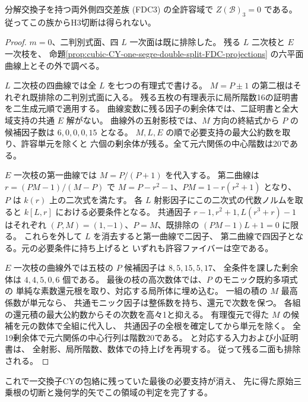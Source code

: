 \begin{theorem}\label{thm:cubic-CY-one-segre-double-split-FDC-empty}
分解交換子を持つ両外側四交差族 (FDC3) の全許容域で
$Z(\mathcal B)_3=0$ である。従ってこの族からH3切断は得られない。
\end{theorem}
\begin{proof}
$m=0$、二判別式面、四 $L$ 一次面は既に排除した。
残る $L$ 二次枝と $E$ 一次枝を、
命題\ref{prop:cubic-CY-one-segre-double-split-FDC-projections}
の六平面曲線上とその外で調べる。

$L$ 二次枝の四曲線では全 $L$ を七つの有理式で書ける。
$M=P\pm1$ の第二根はそれぞれ既排除の二判別式面に入る。
残る五枚の有理表示に局所階数16の証明書を二生成元順で適用する。
曲線変数に残る因子の剰余体では、二証明書と全大域支持の共通 $E$ 解がない。
曲線外の五射影枝では、$M$ 方向の終結式から
$P$ の候補因子数は $6,0,0,0,15$ となる。
$M,L,E$ の順で必要支持の最大公約数を取り、許容単元を除くと
六個の剰余体が残る。全て元六関係の中心階数は20である。

$E$ 一次枝の第一曲線では $M=P/(P+1)$ を代入する。
第二曲線は $r=(PM-1)/(M-P)$ で
$M=P-r^2-1$、$PM=1-r(r^2+1)$ となり、
$P$ は $k(r)$ 上の二次式を満たす。
各 $L$ 射影因子にこの二次式の代数ノルムを取ると
$k[L,r]$ における必要条件となる。
共通因子 $r-1,r^2+1,L(r^3+r)-1$ はそれぞれ
$(P,M)=(1,-1)$、$P=M$、既排除の $(PM-1)L+1=0$ に限る。
これらを外して $L$ を消去すると第一曲線で二因子、
第二曲線で四因子となる。元の必要条件に持ち上げると
いずれも許容ファイバーは空である。

$E$ 一次枝の曲線外では五枝の $P$ 候補因子は $8,5,15,5,17$、
全条件を課した剰余体は $4,4,5,0,6$ 個である。
最後の枝の高次数体では、$P$ のモニック既約多項式の
単純な素数還元根を取り、対応する局所体に埋め込む。
一組の積の $M$ 最高係数が単元なら、
共通モニック因子は整係数を持ち、還元で次数を保つ。
各組の還元積の最大公約数からその次数を高々1と抑える。
有理復元で得た $M$ の候補を元の数体で全組に代入し、
共通因子の全根を確定してから単元を除く。
全19剰余体で元六関係の中心行列は階数20である。
と対応する入力および小証明書は、
全射影、局所階数、数体での持上げを再現する。
従って残る二面も排除される。
\end{proof}

これで一交換子CYの包絡に残っていた最後の必要支持が消え、
先に得た原始三乗根の切断と幾何学的矢でこの領域の判定を完了する。

